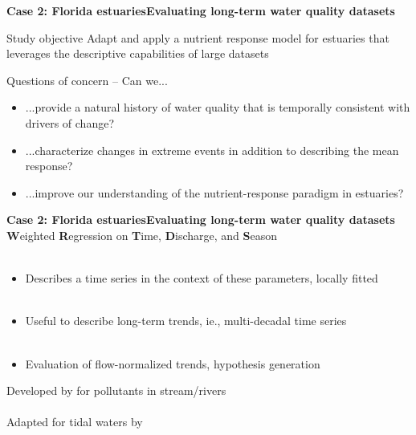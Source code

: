\documentclass[serif]{beamer}\usepackage[]{graphicx}\usepackage[]{color}
\begin{document}
\begin{frame}{\textbf{Case 2: Florida estuaries}}{\textbf{Evaluating long-term water quality datasets}}
\onslide<+->
\begin{block}{Study objective}
Adapt and apply a nutrient response model for estuaries that leverages the descriptive capabilities of large datasets \scriptsize \cite{Beck15}
\end{block}
\vspace{0.2in}
\onslide<+->
Questions of concern -- Can we...
\begin{itemize}
\item ...provide a natural history of water quality that is temporally consistent with drivers of change?
\onslide<+->
\item ...characterize changes in extreme events in addition to describing the mean response?  
\onslide<+->
\item ...improve our understanding of the nutrient-response paradigm in estuaries?
\end{itemize}
\end{frame}

\begin{frame}{\textbf{Case 2: Florida estuaries}}{\textbf{Evaluating long-term water quality datasets}}
\onslide<+->
\textbf{W}eighted \textbf{R}egression on \textbf{T}ime, \textbf{D}ischarge, and \textbf{S}eason \\~\\
\begin{itemize}
\item Describes a time series in the context of these parameters, locally fitted \\~\\
\item Useful to describe long-term trends, ie., multi-decadal time series \\~\\
\item Evaluation of flow-normalized trends, hypothesis generation
\end{itemize}
\onslide<+->
\vspace{0.1in}
Developed by \cite{Hirsch10} for pollutants in stream/rivers\\~\\
Adapted for tidal waters by \cite{Beck15}
\end{frame}
\end{document}
